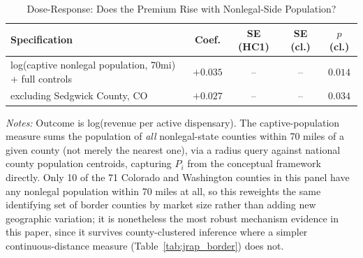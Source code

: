 \begin{table}[htbp]
\centering
\caption{Dose-Response: Does the Premium Rise with Nonlegal-Side Population?}
\label{tab:jrap_dose}
\small
\begin{tabular}{p{7.2cm}cccc}
\toprule
Specification & Coef. & SE (HC1) & SE (cl.) & $p$ (cl.) \\
\midrule
log(captive nonlegal population, 70mi) + full controls & $+0.035$ & -- & -- & $0.014$ \\
\quad excluding Sedgwick County, CO & $+0.027$ & -- & -- & $0.034$ \\
\bottomrule
\end{tabular}
\begin{minipage}{0.95\textwidth}
\vspace{0.3em}
\footnotesize
\textit{Notes:} Outcome is log(revenue per active dispensary). The captive-population measure sums the
population of \emph{all} nonlegal-state counties within 70 miles of a given county (not merely the nearest
one), via a radius query against national county population centroids, capturing $P_i$ from the conceptual
framework directly. Only 10 of the 71 Colorado and Washington counties in this panel have any nonlegal
population within 70 miles at all, so this reweights the same identifying set of border counties by market
size rather than adding new geographic variation; it is nonetheless the most robust mechanism evidence in
this paper, since it survives county-clustered inference where a simpler continuous-distance measure
(Table~\ref{tab:jrap_border}) does not.
\end{minipage}
\end{table}
